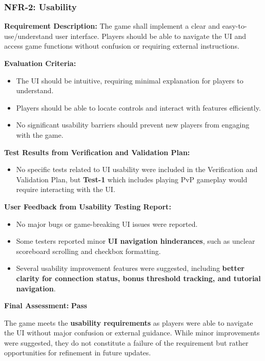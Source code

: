 \documentclass[12pt, titlepage]{article}
\begin{document}
\subsubsection{NFR-2: Usability}
\label{NFR2}

\textbf{Requirement Description:}  
The game shall implement a clear and easy-to-use/understand user interface. Players should be able to navigate the UI and access game functions without confusion or requiring external instructions.

\textbf{Evaluation Criteria:}  
\begin{itemize}
    \item The UI should be intuitive, requiring minimal explanation for players to understand.
    \item Players should be able to locate controls and interact with features efficiently.
    \item No significant usability barriers should prevent new players from engaging with the game.
\end{itemize}

\textbf{Test Results from Verification and Validation Plan:}  
\begin{itemize}
    \item No specific tests related to UI usability were included in the Verification and Validation Plan, but \textbf{Test-1} which includes playing PvP gameplay would require interacting with the UI.
\end{itemize}

\textbf{User Feedback from Usability Testing Report:}  
\begin{itemize}
    \item No major bugs or game-breaking UI issues were reported.
    \item Some testers reported minor \textbf{UI navigation hinderances}, such as unclear scoreboard scrolling and checkbox formatting.
    \item Several usability improvement features were suggested, including \textbf{better clarity for connection status, bonus threshold tracking, and tutorial navigation}.
\end{itemize}

\textbf{Final Assessment:} \textbf{Pass}  

The game meets the \textbf{usability requirements} as players were able to navigate the UI without major confusion or external guidance. While minor improvements were suggested, they do not constitute a failure of the requirement but rather opportunities for refinement in future updates.
\end{document}

